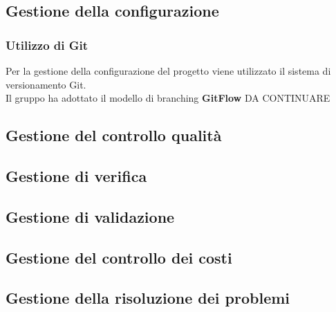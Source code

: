     \subsection{Gestione della configurazione}

        \subsubsection{Utilizzo di Git}
        Per la gestione della configurazione del progetto viene utilizzato il sistema di versionamento Git.\\
        Il gruppo ha adottato il modello di branching \textbf{GitFlow} DA CONTINUARE

    \subsection{Gestione del controllo qualità}
    \subsection{Gestione di verifica}
    \subsection{Gestione di validazione}
    \subsection{Gestione del controllo dei costi}
    \subsection{Gestione della risoluzione dei problemi}

